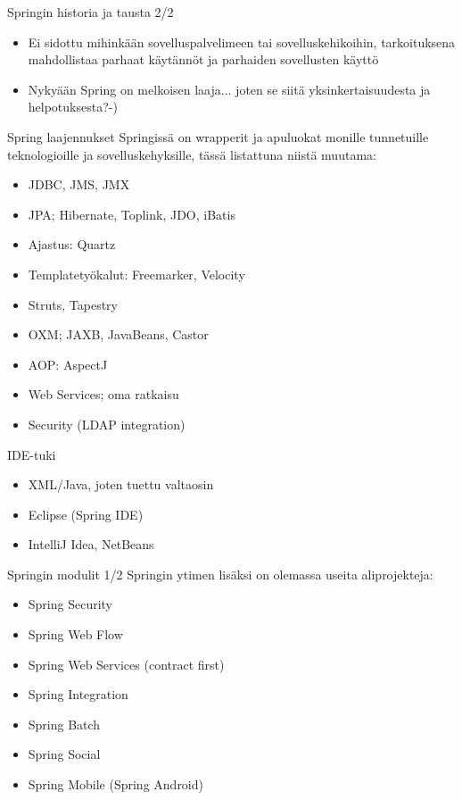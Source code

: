\documentclass[hyperref={pdfauthor=\AUTHOR},14pt]{beamer}
\begin{document}
\begin{frame}{Springin historia ja tausta 2/2}
\begin{itemize}
\item Ei sidottu mihinkään sovelluspalvelimeen tai sovelluskehikoihin,
  tarkoituksena mahdollistaa parhaat käytännöt ja parhaiden
  sovellusten käyttö
\item Nykyään Spring on melkoisen laaja... joten se siitä
  yksinkertaisuudesta ja helpotuksesta?-)
\end{itemize}
\end{frame}


\begin{frame}{Spring laajennukset}
Springissä on wrapperit ja apuluokat monille tunnetuille
teknologioille ja sovelluskehyksille, tässä listattuna niistä muutama:
\begin{itemize}
\item JDBC, JMS, JMX
\item JPA; Hibernate, Toplink, JDO, iBatis
\item Ajastus: Quartz
\item Templatetyökalut: Freemarker, Velocity
\item Struts, Tapestry
\item OXM; JAXB, JavaBeans, Castor 
\item AOP: AspectJ
\item Web Services; oma ratkaisu
\item Security (LDAP integration)
\end{itemize}
\end{frame}

\begin{frame}{IDE-tuki}
\begin{itemize}
\item XML/Java, joten tuettu valtaosin
\item Eclipse (Spring IDE)
\item IntelliJ Idea, NetBeans
\end{itemize}
\end{frame}


\begin{frame}{Springin modulit 1/2}
Springin ytimen lisäksi on olemassa useita aliprojekteja:
\begin{itemize}
\item Spring Security
\item Spring Web Flow
\item Spring Web Services (contract first)
\item Spring Integration 
\item Spring Batch
\item Spring Social
\item Spring Mobile (Spring Android)
\end{itemize}
\end{frame}
\end{document}
